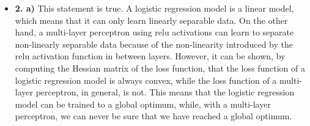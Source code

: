 \documentclass[12pt]{article}
\begin{document}
\begin{itemize}
\begin{figure}[h]
    \end{figure}
    \item \textbf{2. a)} This statement is true. A logistic regression model is a linear model, which means that it can only learn linearly separable data. On the other hand, a multi-layer perceptron using relu activations can learn to separate non-linearly separable data because of the non-linearity introduced by the relu activation function in between layers. However, it can be shown, by computing the Hessian matrix of the loss function, that the loss function of a logistic regression model is always convex, while the loss function of a multi-layer perceptron, in general, is not. This means that the logistic regression model can be trained to a global optimum, while, with a multi-layer perceptron, we can never be sure that we have reached a global optimum.
\end{itemize}
\end{document}
